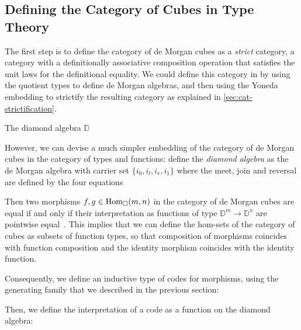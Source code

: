 \subsection{Defining the Category of Cubes in Type Theory}

The first step is to define the category of de Morgan cubes as a \emph{strict}
category, \ie a category with a definitionally associative composition
operation that satisfies the unit laws for the definitional equality.
% 
We could define this category in \SetoidCCplus by using the quotient
types to define de Morgan algebras, and then using the Yoneda embedding to
strictify the resulting category as explained in \cref{sec:cat-strictification}.

\begin{marginfigure}
\caption{The diamond algebra \( \mathbb{D} \)}
\end{marginfigure}
% 
However, we can devise a much simpler embedding of the category of de Morgan
cubes in the category of types and functions:
% 
define the \emph{diamond algebra} as the de Morgan algebra with carrier set 
\( \{ i_0, i_l, i_r, i_1 \} \) where the meet, join and reversal are defined by 
the four equations
% 
Then two morphisms \( f, g \in \hom[\catCube]{m}{n} \) in the category of de 
Morgan cubes are equal if and only if their interpretation as functions of type 
\( \mathbb{D}^m \to \mathbb{D}^n \) are pointwise equal~.
% 
This implies that we can define the hom-sets of the category of cubes as 
subsets of function types, so that composition of morphisms coincides 
with function composition and the identity morphism coincides with the 
identity function.

Consequently, we define an inductive type of codes for morphisms, using the
generating family that we described in the previous section: 


Then, we define the interpretation of a code as a function on the diamond
algebra:

